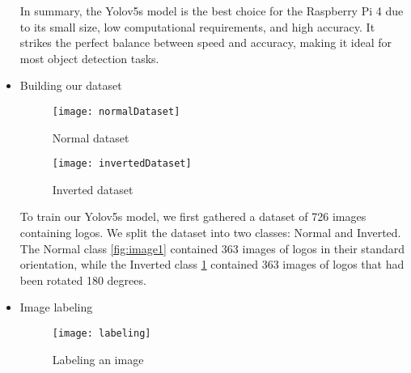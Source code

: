 \begin{itemize}
In summary, the Yolov5s model is the best choice for the Raspberry Pi 4 due to its small size, low computational requirements, and high accuracy. It strikes the perfect balance between speed and accuracy, making it ideal for most object detection tasks.


\item{Building our dataset}
\FloatBarrier
\begin{figure}[ht]
  \centering
  \begin{minipage}[b]{0.45\linewidth}
    \texttt{[image: normalDataset]}
    \caption{Normal dataset}
    \label{fig:image1}
  \end{minipage}
  \hfill
  \begin{minipage}[b]{0.45\linewidth}
    \texttt{[image: invertedDataset]}
    \caption{Inverted dataset}
    \label{fig:image2}
  \end{minipage}
\end{figure}
\FloatBarrier

To train our Yolov5s model, we first gathered a dataset of 726 images containing logos. We split the dataset into two classes: Normal and Inverted. The Normal class \ref{fig:image1} contained 363 images of logos in their standard orientation, while the Inverted class \ref{fig:image2} contained 363 images of logos that had been rotated 180 degrees.

\item{Image labeling}
\FloatBarrier
\begin{figure}[ht]
  \centering
    \texttt{[image: labeling]}
    \caption{Labeling an image}
    \label{fig:labeling}



\end{figure}
\end{itemize}
